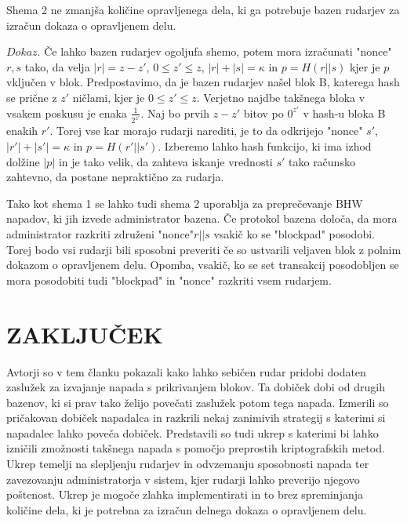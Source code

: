 \documentclass{acm_proc_article-sp}
\begin{document}
\begin{lema}\label{lema6}
	Shema 2 ne zmanjša količine opravljenega dela, ki ga potrebuje bazen rudarjev za izračun dokaza o opravljenem delu.
\end{lema}

\noindent\textit{$Dokaz$}. Če lahko bazen rudarjev ogoljufa shemo, potem mora izračunati "nonce"\textit{$r,s$} tako, da velja \textit{$|r| = z - z'$}, \textit{$0 \leq z' \leq z$}, \textit{$|r| + |s| = \kappa$} in \textit{$p = H(r||s)$} kjer je \textit{$p$} vključen v blok. Predpostavimo, da je bazen rudarjev našel blok B, katerega hash se prične z \textit{$z'$} ničlami, kjer je \textit{$0 \leq z' \leq z$}. Verjetno najdbe takšnega bloka v vsakem poskusu je enaka $\frac{1}{2^{z'}}$. Naj bo prvih \textit{$z - z'$} bitov po \textit{$0^{z'}$} v hash-u bloka B enakih \textit{$r'$}. Torej vse kar morajo rudarji narediti, je to da odkrijejo "nonce" \textit{$s'$}, \textit{$|r'| + |s'| = \kappa$} in \textit{$p = H(r'||s')$}. Izberemo lahko hash funkcijo, ki ima izhod dolžine \textit{$|p|$} in je tako velik, da zahteva iskanje vrednosti \textit{$s'$} tako računsko zahtevno, da postane nepraktično za rudarja.

Tako kot shema 1 se lahko tudi shema 2 uporablja za preprečevanje BHW napadov, ki jih izvede administrator bazena. Če protokol bazena določa, da mora administrator razkriti združeni "nonce"\textit{$r||s$} vsakič ko se "blockpad" posodobi. Torej bodo vsi rudarji bili sposobni preveriti če so ustvarili veljaven blok z polnim dokazom o opravljenem delu. Opomba, vsakič, ko se set transakcij posodobljen se mora posodobiti tudi "blockpad" in "nonce" razkriti vsem rudarjem.

\section{ZAKLJUČEK}
Avtorji so v tem članku pokazali kako lahko sebičen rudar pridobi dodaten zaslužek za izvajanje napada s prikrivanjem blokov. Ta dobiček dobi od drugih bazenov, ki si prav tako želijo povečati zaslužek potom tega napada. Izmerili so pričakovan dobiček napadalca in razkrili nekaj zanimivih strategij s katerimi si napadalec lahko poveča dobiček. Predstavili so tudi ukrep s katerimi bi lahko izničili zmožnosti takšnega napada s pomočjo preprostih kriptografskih metod. Ukrep temelji na slepljenju rudarjev in odvzemanju sposobnosti napada ter zavezovanju administratorja v sistem, kjer rudarji lahko preverijo njegovo poštenost. Ukrep je mogoče zlahka implementirati in to brez spreminjanja količine dela, ki je potrebna za izračun delnega dokaza o opravljenem delu.
\end{document}
